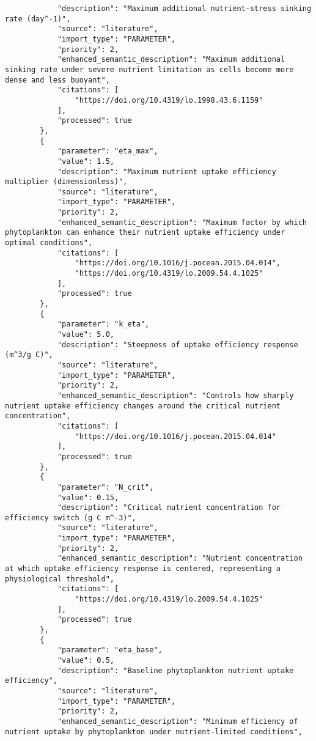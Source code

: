 \begin{lstlisting}
            "description": "Maximum additional nutrient-stress sinking rate (day^-1)",
            "source": "literature",
            "import_type": "PARAMETER",
            "priority": 2,
            "enhanced_semantic_description": "Maximum additional sinking rate under severe nutrient limitation as cells become more dense and less buoyant",
            "citations": [
                "https://doi.org/10.4319/lo.1998.43.6.1159"
            ],
            "processed": true
        },
        {
            "parameter": "eta_max",
            "value": 1.5,
            "description": "Maximum nutrient uptake efficiency multiplier (dimensionless)",
            "source": "literature",
            "import_type": "PARAMETER",
            "priority": 2,
            "enhanced_semantic_description": "Maximum factor by which phytoplankton can enhance their nutrient uptake efficiency under optimal conditions",
            "citations": [
                "https://doi.org/10.1016/j.pocean.2015.04.014",
                "https://doi.org/10.4319/lo.2009.54.4.1025"
            ],
            "processed": true
        },
        {
            "parameter": "k_eta",
            "value": 5.0,
            "description": "Steepness of uptake efficiency response (m^3/g C)",
            "source": "literature",
            "import_type": "PARAMETER",
            "priority": 2,
            "enhanced_semantic_description": "Controls how sharply nutrient uptake efficiency changes around the critical nutrient concentration",
            "citations": [
                "https://doi.org/10.1016/j.pocean.2015.04.014"
            ],
            "processed": true
        },
        {
            "parameter": "N_crit",
            "value": 0.15,
            "description": "Critical nutrient concentration for efficiency switch (g C m^-3)",
            "source": "literature",
            "import_type": "PARAMETER",
            "priority": 2,
            "enhanced_semantic_description": "Nutrient concentration at which uptake efficiency response is centered, representing a physiological threshold",
            "citations": [
                "https://doi.org/10.4319/lo.2009.54.4.1025"
            ],
            "processed": true
        },
        {
            "parameter": "eta_base",
            "value": 0.5,
            "description": "Baseline phytoplankton nutrient uptake efficiency",
            "source": "literature",
            "import_type": "PARAMETER",
            "priority": 2,
            "enhanced_semantic_description": "Minimum efficiency of nutrient uptake by phytoplankton under nutrient-limited conditions",

\end{lstlisting}
